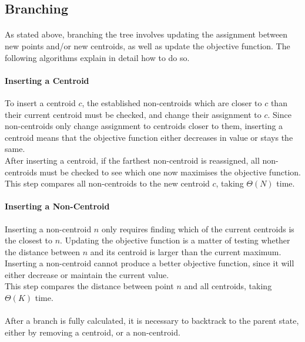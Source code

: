 \subsection{Branching}
\paragraph{}
As stated above, branching the tree involves updating the assignment between new points and/or new centroids, as well as update the objective function. The following algorithms explain in detail how to do so.
\paragraph{Inserting a Centroid}
To insert a centroid $c$, the established non-centroids which are closer to $c$ than their current centroid must be checked, and change their assignment to $c$.
Since non-centroids only change assignment to centroids closer to them, inserting a centroid means that the objective function either decreases in value or stays the same.\\
After inserting a centroid, if the farthest non-centroid is reassigned, all non-centroids must be checked to see which one now maximises the objective function.\\
This step compares all non-centroids to the new centroid $c$, taking $\Theta(N)$ time.

\paragraph{Inserting a Non-Centroid}
Inserting a non-centroid $n$ only requires finding which of the current centroids is the closest to $n$. Updating the objective function is a matter of testing whether the distance between $n$ and its centroid is larger than the current maximum.\\
Inserting a non-centroid cannot produce a better objective function, since it will either decrease or maintain the current value. \\
This step compares the distance between point $n$ and all centroids, taking $\Theta(K)$ time.
\paragraph{}
After a branch is fully calculated, it is necessary to backtrack to the parent state, either by removing a centroid, or a non-centroid.
